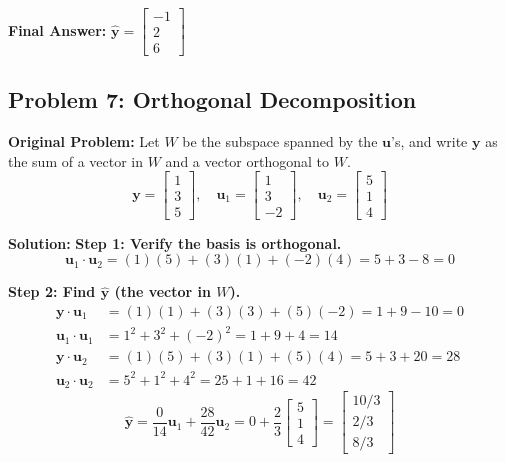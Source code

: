 \documentclass[11pt, letterpaper]{article}
\theoremstyle{definition}
\theoremstyle{remark}
\begin{document}
\textbf{Final Answer:} $\hat{\mathbf{y}} = \begin{bmatrix} -1 \\ 2 \\ 6 \end{bmatrix}$

\vspace{1em}
\subsection{Problem 7: Orthogonal Decomposition}
\textbf{Original Problem:} Let $W$ be the subspace spanned by the $\mathbf{u}$'s, and write $\mathbf{y}$ as the sum of a vector in $W$ and a vector orthogonal to $W$.
\[ \mathbf{y} = \begin{bmatrix} 1 \\ 3 \\ 5 \end{bmatrix}, \quad \mathbf{u}_1 = \begin{bmatrix} 1 \\ 3 \\ -2 \end{bmatrix}, \quad \mathbf{u}_2 = \begin{bmatrix} 5 \\ 1 \\ 4 \end{bmatrix} \]

\textbf{Solution:}
\textbf{Step 1: Verify the basis is orthogonal.}
\[ \mathbf{u}_1 \cdot \mathbf{u}_2 = (1)(5) + (3)(1) + (-2)(4) = 5 + 3 - 8 = 0 \]

\textbf{Step 2: Find $\hat{\mathbf{y}}$ (the vector in $W$).}
\begin{align*}
    \mathbf{y} \cdot \mathbf{u}_1 &= (1)(1) + (3)(3) + (5)(-2) = 1 + 9 - 10 = 0 \\
    \mathbf{u}_1 \cdot \mathbf{u}_1 &= 1^2 + 3^2 + (-2)^2 = 1 + 9 + 4 = 14 \\
    \mathbf{y} \cdot \mathbf{u}_2 &= (1)(5) + (3)(1) + (5)(4) = 5 + 3 + 20 = 28 \\
    \mathbf{u}_2 \cdot \mathbf{u}_2 &= 5^2 + 1^2 + 4^2 = 25 + 1 + 16 = 42
\end{align*}
\[ \hat{\mathbf{y}} = \frac{0}{14}\mathbf{u}_1 + \frac{28}{42}\mathbf{u}_2 = 0 + \frac{2}{3} \begin{bmatrix} 5 \\ 1 \\ 4 \end{bmatrix} = \begin{bmatrix} 10/3 \\ 2/3 \\ 8/3 \end{bmatrix} \]
\end{document}
